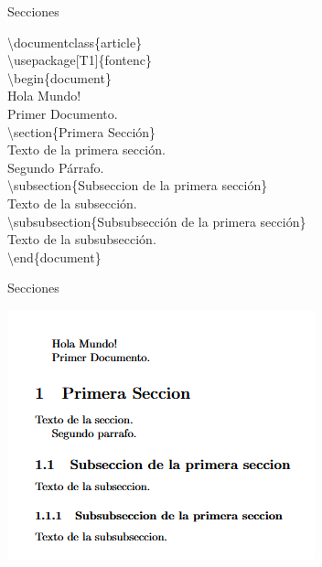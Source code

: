 \documentclass[12pt]{beamer}
\begin{document}
\begin{frame}{Secciones}
  \begin{center}
    \begin{minipage}{0.8\textwidth}
  \begin{block}{}
    \footnotesize
    \textbackslash documentclass\{article\}\\
    \textbackslash usepackage[T1]\{fontenc\}\\
    \textbackslash begin\{document\}\\
\hspace{1cm}Hola Mundo!\\[10pt]
\hspace{1cm}Primer Documento.\\[10pt]

\hspace{1cm}\textbackslash section\{Primera Sección\}\\
\hspace{1cm}Texto de la primera sección.\\[10pt]

\hspace{1cm}Segundo Párrafo.\\[10pt]

\hspace{1cm}\textbackslash subsection\{Subseccion de la primera sección\}\\

\hspace{1cm}Texto de la subsección.\\[10pt]

\hspace{1cm}\textbackslash subsubsection\{Subsubsección de la primera sección\}\\

\hspace{1cm}Texto de la subsubsección.\\

\textbackslash end\{document\}\\
  \end{block}
  \end{minipage}
  \end{center}
\end{frame}
\begin{frame}{Secciones}
  \begin{center}
    \includegraphics[scale=1]{Secciones.png}  
  \end{center}
\end{frame}
\end{document}
